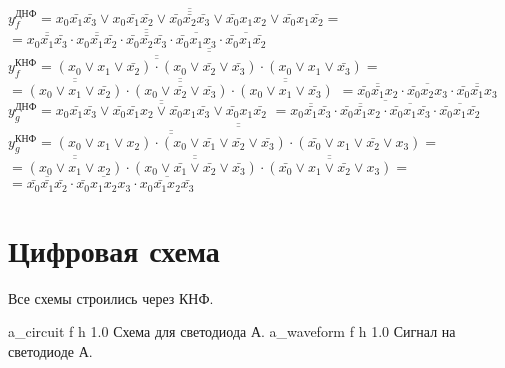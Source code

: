 \documentclass{bmstu}
\begin{document}
	$y^{\text{ДНФ}}_f = \overline{\overline{x_0 \bar{x_1} \bar{x_3} \vee x_0 \bar{x_1} \bar{x_2} \vee \bar{x_0} \bar{x_2} \bar{x_3} \vee \bar{x_0} x_1 x_2 \vee \bar{x_0} x_1 \bar{x_2}}} =$ \\
	$= \overline{\overline{x_0 \bar{x_1} \bar{x_3}} \cdot \overline{x_0 \bar{x_1} \bar{x_2}} \cdot \overline{\bar{x_0} \bar{x_2} \bar{x_3}} \cdot \overline{\bar{x_0} x_1 x_3} \cdot \overline{\bar{x_0} x_1 \bar{x_2}}}$ \\
	$y^{\text{КНФ}}_f = \overline{\overline{\overline{\overline{(x_0 \vee x_1 \vee \bar{x_2}) \cdot(x_0 \vee \bar{x_2} \vee \bar{x_3})}} \cdot (x_0 \vee x_1 \vee \bar{x_3})}} =$ \\
	$= \overline{\overline{(x_0 \vee x_1 \vee \bar{x_2})}} \cdot \overline{\overline{(x_0 \vee \bar{x_2} \vee \bar{x_3})}} \cdot \overline{\overline{(x_0 \vee x_1 \vee \bar{x_3})}}$
	$= \overline{\bar{x_0} \bar{x_1} x_2} \cdot \overline{\bar{x_0} x_2 x_3} \cdot \overline{\bar{x_0} \bar{x_1} x_3}$ \\
	
	$y^{\text{ДНФ}}_g = \overline{\overline{x_0 \bar{x_1} \bar{x_3} \vee \bar{x_0} \bar{x_1} x_2 \vee \bar{x_0} x_1 \bar{x_3} \vee \bar{x_0} x_1 \bar{x_2}}}$
	$= \overline{\overline{x_0 \bar{x_1} \bar{x_3}} \cdot \overline{\bar{x_0} \bar{x_1} x_2} \cdot \overline{\bar{x_0} x_1 \bar{x_3}} \cdot \overline{\bar{x_0} x_1 \bar{x_2}}}$ \\
	$y^{\text{КНФ}}_g = \overline{\overline{\overline{\overline{(x_0 \vee x_1 \vee x_2) \cdot (x_0 \vee \bar{x_1} \vee \bar{x_2} \vee \bar{x_3})}} \cdot (\bar{x_0} \vee x_1 \vee \bar{x_2} \vee x_3)}} =$ \\
	$= \overline{\overline{(x_0 \vee x_1 \vee x_2)}} \cdot \overline{\overline{(x_0 \vee \bar{x_1} \vee \bar{x_2} \vee \bar{x_3})}} \cdot \overline{\overline{(\bar{x_0} \vee x_1 \vee \bar{x_2} \vee x_3)}} =$ \\
	$= \overline{\bar{x_0} \bar{x_1} \bar{x_2}} \cdot \overline{\bar{x_0} x_1 x_2 x_3} \cdot \overline{x_0 \bar{x_1} x_2 \bar{x_3}}$ \\
	
	\section{Цифровая схема}
	\begin{flushleft}
		Все схемы строились через КНФ.
	\end{flushleft}
	
	{a_circuit}
	{f} %
	{h} %
	{1.0\textwidth} %
	{Схема для светодиода А.} %
	{a_waveform}
	{f} %
	{h} %
	{1.0\textwidth} %
	{Сигнал на светодиоде А.} %
	
\end{document}

